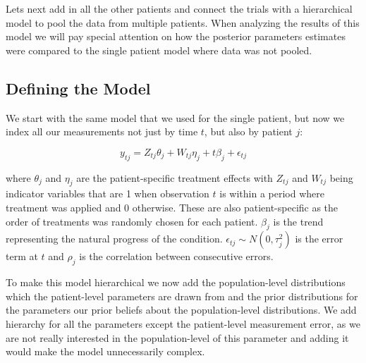 \documentclass[12pt,a4paper,leqno]{report}
\theoremstyle{plain}
\theoremstyle{definition}
\theoremstyle{remark}
\begin{document}
Lets next add in all the other patients and connect the trials with a hierarchical
model to pool the data from multiple patients. When analyzing the results of this model
we will pay special attention on how the posterior parameters estimates were compared to the single patient
model where data was not pooled.

\subsection{Defining the Model}\label{hiermodel}

We start with the same model that we used for the single patient, but now we index all our
measurements not just by time \(t\), but also by patient \(j\):

\begin{def}\label{hierarchicalmodel}
    \begin{equation}\label{}
        y_{tj} = Z_{tj}\theta_{j} + W_{tj}\eta_{j} + t\beta_{j} + \epsilon_{tj}
    \end{equation}
\end{def} where \(\theta_{j} \) and \(\eta_{j} \) are the patient-specific treatment
effects with \(Z_{tj}\) and \(W_{tj}\) being indicator
variables that are 1 when observation \(t\) is within a period where treatment was applied and
0 otherwise. These are also patient-specific as the order of treatments was randomly
chosen for each patient. \(\beta_j\) is the trend representing the natural progress of the
condition. \(\epsilon_{tj} \sim N(0,\tau_j^2) \) is the error term at \(t\) and
\(\rho_j\) is the correlation between consecutive errors.

To make this model hierarchical we now add the population-level distributions which
the patient-level parameters are drawn from and the prior distributions for the
parameters our prior beliefs about the population-level distributions. We add hierarchy for all the
parameters except the patient-level measurement error, as
we are not really interested in the population-level of this parameter and adding it
would make the model unnecessarily complex.
\end{document}
